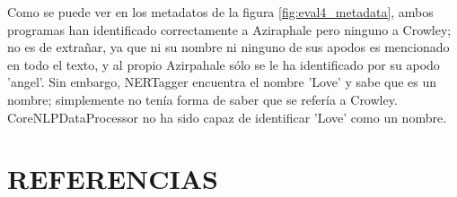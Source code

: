 \documentclass{pre-tfg}
\begin{document}
Como se puede ver en los metadatos de la figura \ref{fig:eval4_metadata}, ambos programas han identificado correctamente a Aziraphale pero ninguno a Crowley; no es de extrañar, ya que ni su nombre ni ninguno de sus apodos es mencionado en todo el texto, y al propio Azirpahale sólo se le ha identificado por su apodo 'angel'. Sin embargo, NERTagger encuentra el nombre 'Love' y sabe que es un nombre; simplemente no tenía forma de saber que se refería a Crowley. CoreNLPDataProcessor no ha sido capaz de identificar 'Love' como un nombre.



\cleardoublepage
\section{REFERENCIAS}





\singlespacing
%

\end{document}
